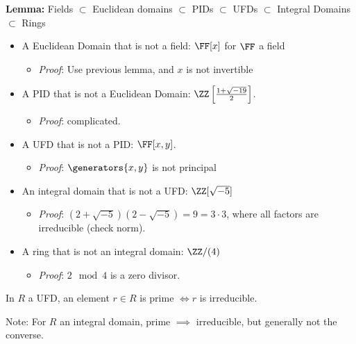 \textbf{Lemma:} Fields \(\subset\) Euclidean domains \(\subset\) PIDs
\(\subset\) UFDs \(\subset\) Integral Domains \(\subset\) Rings

\begin{itemize}
\tightlist
\item
  A Euclidean Domain that is not a field: \(\FF[x]\) for \(\FF\) a field

  \begin{itemize}
  \tightlist
  \item
    \emph{Proof}: Use previous lemma, and \(x\) is not invertible
  \end{itemize}
\item
  A PID that is not a Euclidean Domain:
  \(\ZZ\left[\frac{1 + \sqrt{-19}}{2}\right]\).

  \begin{itemize}
  \tightlist
  \item
    \emph{Proof}: complicated.
  \end{itemize}
\item
  A UFD that is not a PID: \(\FF[x, y]\).

  \begin{itemize}
  \tightlist
  \item
    \emph{Proof}: \(\generators{x, y}\) is not principal
  \end{itemize}
\item
  An integral domain that is not a UFD: \(\ZZ[\sqrt{-5}]\)

  \begin{itemize}
  \tightlist
  \item
    \emph{Proof}: \((2+\sqrt{-5})(2-\sqrt{-5})=9=3\cdot 3\), where all
    factors are irreducible (check norm).
  \end{itemize}
\item
  A ring that is not an integral domain: \(\ZZ/(4)\)

  \begin{itemize}
  \tightlist
  \item
    \emph{Proof}: \(2 \mod 4\) is a zero divisor.
  \end{itemize}
\end{itemize}

\begin{description}
\tightlist
\item[Lemma]
In \(R\) a UFD, an element \(r\in R\) is prime \(\iff r\) is
irreducible.
\end{description}

Note: For \(R\) an integral domain, prime \(\implies\) irreducible, but
generally not the converse.


